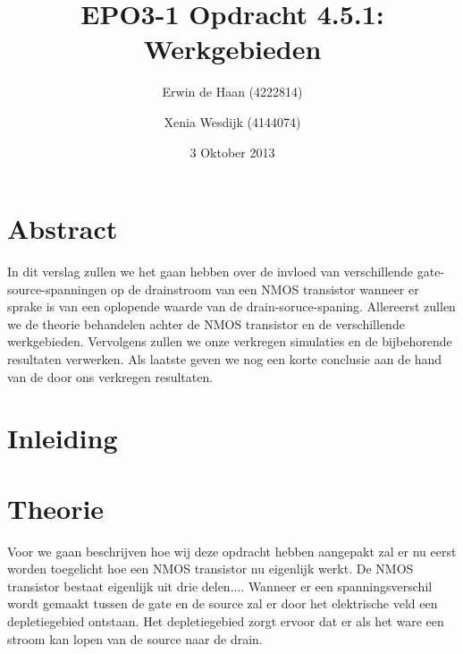 \documentclass{scrartcl}  %
\author{Erwin {de Haan} (4222814) \and {Xenia Wesdijk} (4144074)}
\title{EPO3-1   Opdracht 4.5.1: Werkgebieden}
\date{3 Oktober 2013}
\begin{document}
\maketitle
{}
\vspace{80 mm}
\section*{Abstract}
In dit verslag zullen we het gaan hebben over de invloed van verschillende gate-source-spanningen op de drainstroom van een NMOS transistor wanneer er sprake is van een oplopende waarde van de drain-soruce-spaning. Allereerst zullen we de theorie behandelen achter de NMOS transistor en de verschillende werkgebieden. Vervolgens zullen we onze verkregen simulaties en de bijbehorende resultaten verwerken. Als laatste geven we nog een korte conclusie aan de hand van de door ons verkregen resultaten. 
\newpage
\setlength{\cftbeforetoctitleskip}{-3em}
\tableofcontents

\section{Inleiding}

\newpage
{}

\section{Theorie}
Voor we gaan beschrijven hoe wij deze opdracht hebben aangepakt zal er nu eerst worden toegelicht hoe een NMOS transistor nu eigenlijk werkt. De NMOS transistor bestaat eigenlijk uit drie delen....
Wanneer er een spanningsverschil wordt gemaakt tussen de gate en de source zal er door het elektrische veld een depletiegebied ontstaan. Het depletiegebied zorgt ervoor dat er als het ware een stroom kan lopen van de source naar de drain. 
\end{document}
